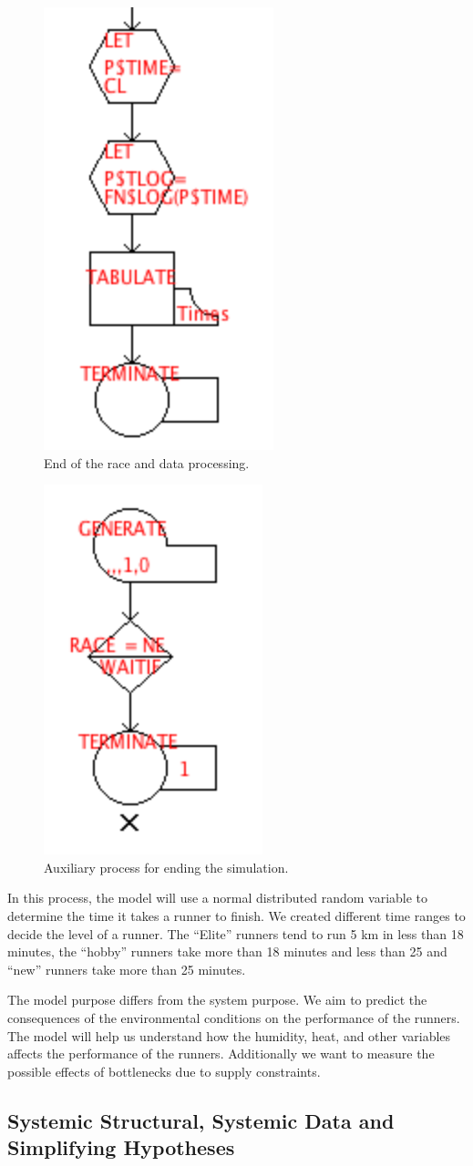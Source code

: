 \documentclass[conference]{IEEEtran}
\begin{document}
\begin{figure}[]
    \centerline{\includegraphics[width=0.2\linewidth]{figs/end_diag.png}}
    \caption{End of the race and data processing.}
    \label{fig:end_diagram}
\end{figure}

\begin{figure}[]
    \centerline{\includegraphics[width=0.2\linewidth]{figs/aux_diag.png}}
    \caption{Auxiliary process for ending the simulation.}
    \label{fig:aux_diagram}
\end{figure}


In this process, the model will use a normal distributed random variable to determine the time it takes a runner to finish. We created different time ranges to decide the level of a runner. The ``Elite'' runners tend to run 5 km in less than 18 minutes, the ``hobby'' runners take more than 18 minutes and less than 25 and ``new'' runners take more than 25 minutes.

The model purpose differs from the system purpose. We aim to predict the consequences of the environmental conditions on the performance of the runners. The model will help us understand how the humidity, heat, and other variables affects the performance of the runners. Additionally we want to measure the possible effects of bottlenecks due to supply constraints.



\subsection{Systemic Structural, Systemic Data and Simplifying Hypotheses}
\end{document}
